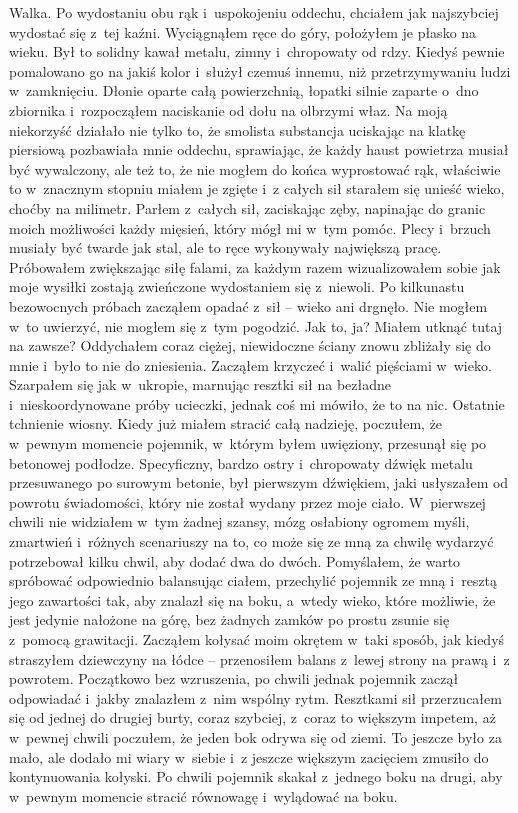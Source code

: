 Walka. Po wydostaniu obu rąk i~uspokojeniu oddechu, chciałem jak najszybciej wydostać się z~tej kaźni. Wyciągnąłem ręce do góry, położyłem je płasko na wieku. Był to solidny kawał metalu, zimny i~chropowaty od rdzy. Kiedyś pewnie pomalowano go na jakiś kolor i~służył czemuś innemu, niż przetrzymywaniu ludzi w~zamknięciu. Dłonie oparte całą powierzchnią, łopatki silnie zaparte o~dno zbiornika i~rozpocząłem naciskanie od dołu na olbrzymi właz. Na moją niekorzyść działało nie tylko to, że smolista substancja uciskając na klatkę piersiową pozbawiała mnie oddechu, sprawiając, że każdy haust powietrza musiał być wywalczony, ale też to, że nie mogłem do końca wyprostować rąk, właściwie to w~znacznym stopniu miałem je zgięte i~z całych sił starałem się unieść wieko, choćby na milimetr. Parłem z~całych sił, zaciskając zęby, napinając do granic moich możliwości każdy mięsień, który mógł mi w~tym pomóc. Plecy i~brzuch musiały być twarde jak stal, ale to ręce wykonywały największą pracę. Próbowałem zwiększając siłę falami, za każdym razem wizualizowałem sobie jak moje wysiłki zostają zwieńczone wydostaniem się z~niewoli. Po kilkunastu bezowocnych próbach zacząłem opadać z~sił -- wieko ani drgnęło. Nie mogłem w~to uwierzyć, nie mogłem się z~tym pogodzić. Jak to, ja? Miałem utknąć tutaj na zawsze? Oddychałem coraz ciężej, niewidoczne ściany znowu zbliżały się do mnie i~było to nie do zniesienia. Zacząłem krzyczeć i~walić pięściami w~wieko. Szarpałem się jak w~ukropie, marnując resztki sił na bezładne i~nieskoordynowane próby ucieczki, jednak coś mi mówiło, że to na nic. Ostatnie tchnienie wiosny. Kiedy już miałem stracić całą nadzieję, poczułem, że w~pewnym momencie pojemnik, w~którym byłem uwięziony, przesunął się po betonowej podłodze. Specyficzny, bardzo ostry i~chropowaty dźwięk metalu przesuwanego po surowym betonie, był pierwszym dźwiękiem, jaki usłyszałem od powrotu świadomości, który nie został wydany przez moje ciało. W~pierwszej chwili nie widziałem w~tym żadnej szansy, mózg osłabiony ogromem myśli, zmartwień i~różnych scenariuszy na to, co może się ze mną za chwilę wydarzyć potrzebował kilku chwil, aby dodać dwa do dwóch. Pomyślałem, że warto spróbować odpowiednio balansując ciałem, przechylić pojemnik ze mną i~resztą jego zawartości tak, aby znalazł się na boku, a~wtedy wieko, które możliwie, że jest jedynie nałożone na górę, bez żadnych zamków po prostu zsunie się z~pomocą grawitacji. Zacząłem kołysać moim okrętem w~taki sposób, jak kiedyś straszyłem dziewczyny na łódce -- przenosiłem balans z~lewej strony na prawą i~z powrotem. Początkowo bez wzruszenia, po chwili jednak pojemnik zaczął odpowiadać i~jakby znalazłem z~nim wspólny rytm. Resztkami sił przerzucałem się od jednej do drugiej burty, coraz szybciej, z~coraz to większym impetem, aż w~pewnej chwili poczułem, że jeden bok odrywa się od ziemi. To jeszcze było za mało, ale dodało mi wiary w~siebie i~z jeszcze większym zacięciem zmusiło do kontynuowania kołyski. Po chwili pojemnik skakał z~jednego boku na drugi, aby w~pewnym momencie stracić równowagę i~wylądować na boku. 

